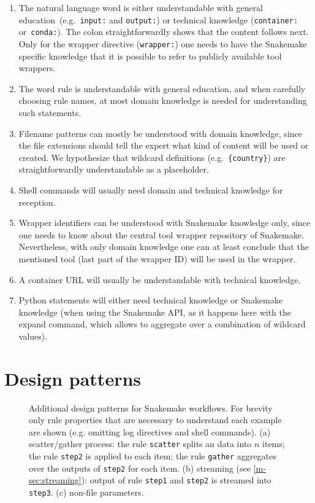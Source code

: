 \documentclass{scrartcl}
\begin{document}
\begin{enumerate}
	\item The natural language word is either understandable with general education~(e.g.\ \lstinline!input:! and \lstinline!output:!) or technical knowledge (\lstinline!container:! or~\lstinline!conda:!).
	      The colon straightforwardly shows that the content follows next.
	      Only for the wrapper directive (\lstinline!wrapper:!) one needs to have the Snakemake specific knowledge that it is possible to refer to publicly available tool wrappers.
	\item
	      The word rule is understandable with general education, and when
	      carefully choosing rule names, at most domain knowledge is needed for
	      understanding such statements.
	\item
	      Filename patterns can mostly be understood with domain knowledge,
	      since the file extensions should tell the expert what kind of content
	      will be used or created.
	      We hypothesize that wildcard definitions (e.g.~\lstinline!{country}!) are straightforwardly understandable as a placeholder.
	\item
	      Shell commands will usually need domain and technical knowledge for
	      reception.
	\item
	      Wrapper identifiers can be understood with Snakemake knowledge only,
	      since one needs to know about the central tool wrapper repository of
	      Snakemake.
	      Nevertheless, with only domain knowledge one can at least conclude that the mentioned tool (last part of the wrapper ID) will be used in the wrapper.
	\item
	      A container URL will usually be understandable with technical
	      knowledge.
	\item
	      Python statements will either need technical knowledge or Snakemake
	      knowledge (when using the Snakemake API, as it happens here with the
	      expand command, which allows to aggregate over a combination of
	      wildcard values).
\end{enumerate}

\section{Design patterns}\label{sec:design-patterns}

\begin{figure}
\caption{Additional design patterns for Snakemake workflows. For brevity only rule properties that are necessary to understand each example are shown (e.g. omitting log directives and shell commands). (a) scatter/gather process: the rule \lstinline!scatter! splits an data into $n$ items; the rule \lstinline!step2! is applied to each item; the rule \lstinline!gather! aggregates over the outputs of \lstinline!step2! for each item. (b) streaming (see \autoref{m-sec:streaming}): output of rule \lstinline!step1! and \lstinline!step2! is streamed into \lstinline!step3!. (c) non-file parameters.}\label{fig:design-patterns}
\end{figure}

\printbibliography
\end{document}
